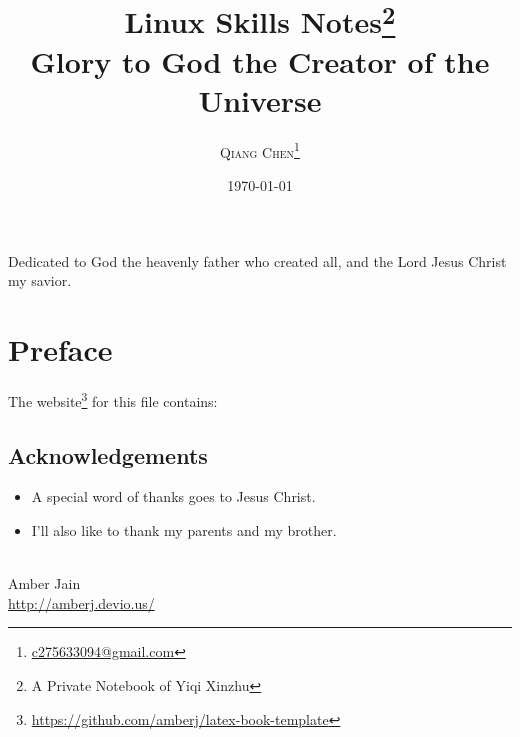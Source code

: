 \documentclass[a4paper,11pt,oneside]{book}
\title{{\Huge\color{red}\bfseries Linux Skills} Notes\footnote{A Private Notebook of Yiqi Xinzhu} \\ \large Glory to God the Creator of the Universe}
\date{\today}
\author{\textsc{Qiang Chen}\thanks{\url{c275633094@gmail.com}}}
\begin{document}
\frontmatter
\maketitle
{}

\begin{dedication}
Dedicated to God the heavenly father who created all, and the Lord Jesus Christ my savior.
\end{dedication}

\tableofcontents
{}

\mainmatter
\chapter*{Preface}
The website\footnote{\url{https://github.com/amberj/latex-book-template}} for this file contains:

\section*{Acknowledgements}
\begin{itemize}
\item A special word of thanks goes to Jesus Christ.
\item I'll also like to thank my parents and my brother.
\end{itemize}
\mbox{}\\
\noindent Amber Jain \\
\noindent \url{http://amberj.devio.us/}



























\end{document}
